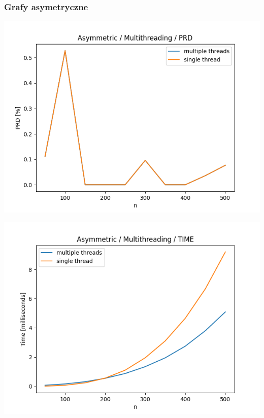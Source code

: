 \documentclass{article}
\begin{document}
\subsubsection{Grafy asymetryczne}

\begin{center}
\includegraphics[width=\textwidth, 
                   height = 0.4\textheight, 
                   keepaspectratio]
                  {plots/multithreading_asymmetric_prd} 
\end{center}

\begin{center}
\includegraphics[width=\textwidth, 
                   height = 0.4\textheight, 
                   keepaspectratio]
                  {plots/multithreading_asymmetric_time} 
\end{center}
\end{document}
